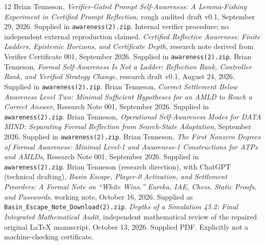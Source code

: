 \documentclass[11pt,letterpaper]{article}
\begin{document}
\begin{thebibliography}{12}
 Brian Tenneson, \emph{Verifier-Gated Prompt Self-Awareness: A Lemma-Fishing Experiment in Certified Prompt Reflection}, rough audited draft v0.1, September 29, 2026. Supplied in \texttt{awareness(2).zip}. Internal verifier procedure; no independent external reproduction claimed.
 \emph{Certified Reflective Awareness: Finite Ladders, Epistemic Horizons, and Certificate Depth}, research note derived from Verifier Certificate 001, September 2026. Supplied in \texttt{awareness(2).zip}.
 Brian Tenneson, \emph{Formal Self-Awareness Is Not a Ladder: Reflection Rank, Controller Rank, and Verified Strategy Change}, research draft v0.1, August 24, 2026. Supplied in \texttt{awareness(2).zip}.
 Brian Tenneson, \emph{Correct Settlement Below Awareness Level Two: Minimal Sufficient Hypotheses for an AMLD to Reach a Correct Answer}, Research Note 001, September 2026. Supplied in \texttt{awareness(2).zip}.
 Brian Tenneson, \emph{Operational Self-Awareness Modes for DATA MIND: Separating Formal Reflection from Search-State Adaptation}, September 2026. Supplied in \texttt{awareness(2).zip}.
 Brian Tenneson, \emph{The First Nonzero Degrees of Formal Awareness: Minimal Level-1 and Awareness-1 Constructions for ATPs and AMLDs}, Research Note 001, September 2026. Supplied in \texttt{awareness(2).zip}.
 Brian Tenneson (research direction), with ChatGPT (technical drafting), \emph{Basin Escape, Player-0 Activation, and Settlement Preorders: A Formal Note on ``White Wins,'' Eureka, IAE, Chess, Static Proofs, and Passwords}, working note, October 16, 2026. Supplied as \texttt{Basin\_Escape\_Note\_Download(2).zip}.
 \emph{Depths of a Simulation 45.2: Final Integrated Mathematical Audit}, independent mathematical review of the repaired original LaTeX manuscript, October 13, 2026. Supplied PDF. Explicitly not a machine-checking certificate.
\end{thebibliography}
\end{document}
